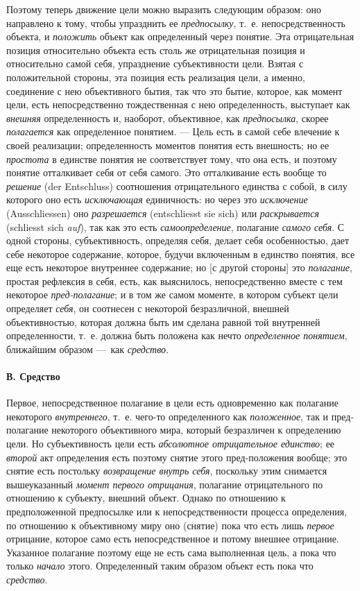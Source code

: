 \documentclass[twoside]{article}
\begin{document}
{{{{Поэтому теперь движение цели можно выразить следующим образом:
оно направлено к тому, чтобы упразднить ее
{\em предпосылку}, т.~е.
непосредственность объекта, и
{\em положить} объект как
определенный через понятие. Эта отрицательная позиция относительно объекта
есть столь же отрицательная позиция и относительно самой себя, упразднение
субъективности цели. Взятая с положительной стороны, эта позиция есть
реализация цели, а именно, соединение с нею объективного бытия, так что это
бытие, которое, как момент цели, есть непосредственно тождественная с нею
определенность, выступает как
{\em внешняя}
определенность и, наоборот, объективное, как
{\em предпосылка}, скорее
{\em полагается} как
определенное понятием. — Цель есть в самой себе влечение к
своей реализации; определенность моментов понятия есть внешность; но ее
{\em простота} в единстве
понятия не соответствует тому, что она есть, и поэтому понятие отталкивает
себя от себя самого. Это отталкивание есть вообще то
{\em решение} (der Entschluss)
соотношения отрицательного единства с собой, в силу которого
оно есть {\em исключающая}
единичность: но через это
{\em исключение} (Ausschliessen)
оно {\em разрешается}
(entschliesst sie sich) или
{\em раскрывается} (schliesst sich
{\em auf}), так как это есть
{\em самоопределение},
полагание {\em самого
себя}. С одной стороны, субъективность, определяя себя,
делает себя особенностью, дает себе некоторое содержание, которое, будучи
включенным в единство понятия, все еще есть некоторое внутреннее
содержание; но [с другой стороны] это
{\em полагание}, простая
рефлексия в себя, есть, как выяснилось, непосредственно вместе с тем
некоторое {\em пред-полагание};
и в том же самом моменте, в котором субъект цели определяет
{\em себя}, он соотнесен
с некоторой безразличной, внешней объективностью, которая должна быть им
сделана равной той внутренней определенности, т.~е. должна быть положена
как нечто {\em определенное понятием},
ближайшим образом —~как
{\em средство}.

\paragraph[В. Средство]{В. Средство}
Первое, непосредственное полагание в цели есть одновременно
как полагание некоторого
{\em внутреннего}, т.~е.
чего-то определенного как
{\em положенное}, так и
пред-полагание некоторого объективного мира, который безразличен к
определению цели. Но субъективность цели есть
{\em абсолютное отрицательное
единство}; ее
{\em второй} акт
определения есть поэтому снятие этого пред-положения вообще; это
снятие есть постольку
{\em возвращение внутрь себя},
поскольку этим снимается вышеуказанный
{\em момент первого отрицания},
полагание отрицательного по отношению к субъекту, внешний
объект. Однако по отношению к предположенной предпосылке или к
непосредственности процесса определения, по отношению к объективному миру
оно (снятие) пока что есть лишь
{\em первое} отрицание,
которое само есть непосредственное и потому внешнее отрицание. Указанное
полагание поэтому еще не есть сама выполненная цель, а пока что только
{\em начало} этого.
Определенный таким образом объект есть пока что
{\em средство}.

}}}}
\end{document}

